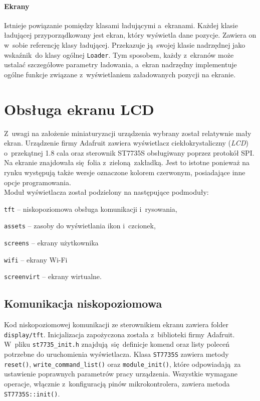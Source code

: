 \documentclass[polish]{aghengthesis}
\let\tempone\itemize
\let\temptwo\enditemize
\renewenvironment{itemize}{\tempone\setlength{\itemsep}{0cm}}{\temptwo}
\begin{document}
			\paragraph{Ekrany}
				Istnieje powiązanie pomiędzy klasami ładującymi a~ekranami. Każdej klasie ładującej przyporządkowany jest ekran, który wyświetla dane pozycje. Zawiera on w~sobie referencję klasy ładującej. Przekazuje ją swojej klasie nadrzędnej jako wskaźnik do klasy ogólnej \lstinline|Loader|. Tym sposobem, każdy z~ekranów może ustalać szczegółowe parametry ładowania, a~ekran nadrzędny implementuje ogólne funkcje związane z~wyświetlaniem załadowanych pozycji na ekranie.
	
	\section{Obsługa ekranu LCD}
		\label{sec:screen}
		Z~uwagi na założenie miniaturyzacji urządzenia wybrany został relatywnie mały ekran. Urządzenie firmy Adafruit zawiera wyświetlacz ciekłokrystaliczny (\textit{LCD}) o~przekątnej 1.8 cala oraz sterownik ST7735S obsługiwany poprzez protokół SPI. Na ekranie znajdowała się folia z~zieloną zakładką. Jest to istotne ponieważ na rynku występują także wersje oznaczone kolorem czerwonym, posiadające inne opcje programowania.
		$ $\\
		
		\noindent
		Moduł wyświetlacza został podzielony na następujące podmoduły:
		\begin{itemize}
			\item \lstinline|tft| -- niskopoziomowa obsługa komunikacji i~rysowania,
			\item \lstinline|assets| -- zasoby do wyświetlania ikon i~czcionek,
			\item \lstinline|screens| -- ekrany użytkownika
			\begin{itemize}
				\item \lstinline|wifi| -- ekrany Wi-Fi
			\end{itemize}
			\item \lstinline|screenvirt| -- ekrany wirtualne.
		\end{itemize}
		
		\subsection{Komunikacja niskopoziomowa}
			Kod niskopoziomowej komunikacji ze sterownikiem ekranu zawiera folder \lstinline|display/tft|. Inicjalizacja zapożyczona została z~biblioteki firmy Adafruit. W~pliku \lstinline|st7735_init.h| znajdują się definicje komend oraz listy poleceń potrzebne do uruchomienia wyświetlacza. Klasa \lstinline|ST7735S| zawiera metody \lstinline|reset()|, \lstinline|write_command_list()| oraz \lstinline|module_init()|, które odpowiadają za ustawienie poprawnych parametrów pracy urządzenia. Wszystkie wymagane operacje, włącznie z~konfiguracją pinów mikrokontrolera, zawiera metoda \lstinline|ST7735S::init()|.
			
\end{document}
